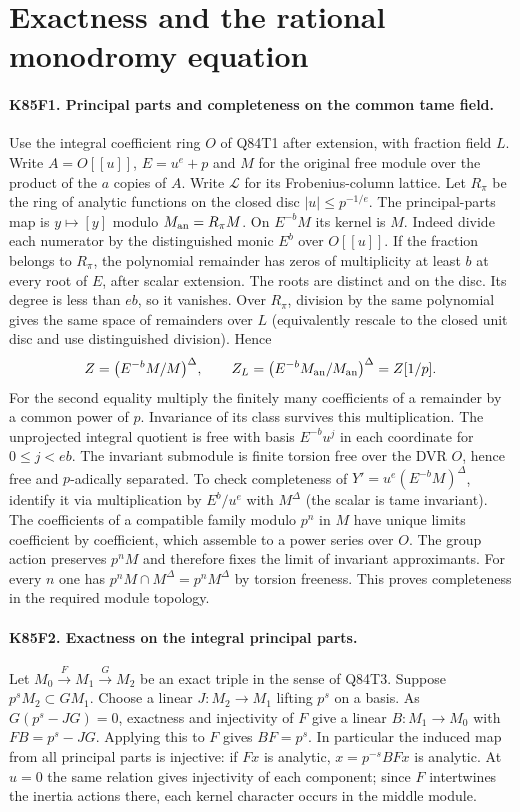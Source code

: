 \section{Exactness and the rational monodromy equation}

\paragraph{K85F1. Principal parts and completeness on the common tame field.}
Use the integral coefficient ring $O$ of Q84T1 after extension, with
fraction field $L$. Write $A=O[[u]]$, $E=u^e+p$ and
$M$ for the original free module over the product of the $a$ copies
of $A$. Write $\mathcal L$ for its Frobenius-column lattice.
Let $R_\pi$ be the ring of analytic functions on the closed disc
$|u|\le p^{-1/e}$. The principal-parts map is
$y\mapsto[y]$ modulo $M_{\rm an}=R_\pi M$. On $E^{-b}M$
its kernel is $M$. Indeed divide each numerator by the distinguished
monic $E^b$ over $O[[u]]$. If the fraction belongs to $R_\pi$,
the polynomial remainder has zeros of multiplicity at least $b$
at every root of $E$, after scalar extension. The roots are distinct
and on the disc. Its degree is less than $eb$, so it vanishes.
Over $R_\pi$, division by the same polynomial gives the same
space of remainders over $L$ (equivalently rescale to the closed
unit disc and use distinguished division). Hence
\[
 Z=\big(E^{-b}M/M\big)^\Delta,\qquad
 Z_L=\big(E^{-b}M_{\rm an}/M_{\rm an}\big)^\Delta=Z[1/p].
\]
For the second equality multiply the finitely many coefficients
of a remainder by a common power of $p$. Invariance of its class
survives this multiplication. The unprojected integral quotient
is free with basis $E^{-b}u^j$ in each coordinate for $0\le j<eb$.
The invariant submodule is finite torsion free over the DVR $O$,
hence free and $p$-adically separated. To check completeness of
$Y'=u^e(E^{-b}M)^\Delta$, identify it via multiplication by
$E^b/u^e$ with $M^\Delta$ (the scalar is tame invariant).
The coefficients of a compatible family modulo $p^n$ in $M$ have
unique limits coefficient by coefficient, which assemble to a
power series over $O$. The group action preserves $p^nM$ and
therefore fixes the limit of invariant approximants. For every $n$
one has $p^nM\cap M^\Delta=p^n M^\Delta$ by torsion freeness.
This proves completeness in the required module topology.

\paragraph{K85F2. Exactness on the integral principal parts.}
Let $M_0\xrightarrow{F}M_1\xrightarrow{G}M_2$ be an exact
triple in the sense of Q84T3. Suppose $p^s M_2\subset G M_1$.
Choose a linear $J:M_2\to M_1$ lifting $p^s$ on a basis.
As $G(p^s-JG)=0$, exactness and injectivity of $F$ give a linear
$B:M_1\to M_0$ with $FB=p^s-JG$. Applying this to $F$ gives
$BF=p^s$. In particular the induced map from all principal parts is
injective: if $Fx$ is analytic, $x=p^{-s}BFx$ is analytic.
At $u=0$ the same relation gives injectivity of each component;
since $F$ intertwines the inertia actions there, each kernel character
occurs in the middle module.

